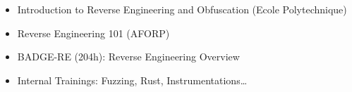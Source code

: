 \twocolumnsection
{
\vspace{1em}
\begin{itemize}
	\item Introduction to Reverse Engineering and Obfuscation (Ecole
		  Polytechnique)
	\item Reverse Engineering 101 (AFORP)
\end{itemize}
}
{
\vspace{1em}
\begin{itemize}
	\item BADGE-RE (204h): Reverse Engineering Overview
	\item Internal Trainings: Fuzzing, Rust, Instrumentations\ldots
\end{itemize}
}

\vspace{1em}
